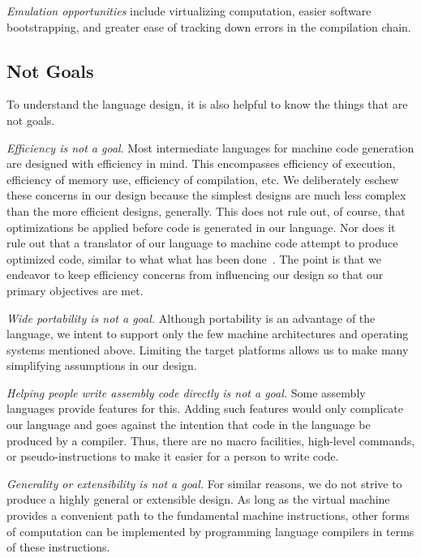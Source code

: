 \emph{Emulation opportunities} include virtualizing computation,
easier software bootstrapping, and greater ease of tracking down errors
in the compilation chain.

\subsection{Not Goals}

To understand the language design, it is also helpful to know the
things that are not goals.

\emph{Efficiency is not a goal}.
Most intermediate languages for machine code generation
are designed with efficiency in mind.
This encompasses efficiency of execution, efficiency
of memory use, efficiency of compilation, etc.
We deliberately eschew these concerns
in our design because the simplest designs
are much less complex than the more efficient designs, generally.
This does not rule out, of course, that optimizations be applied before
code is generated in our language. Nor does it rule out that a translator of
our language to machine code attempt to produce optimized
code, similar to what what has been done~\cite{davidson1980design, tanenbaum1982using}.
The point is that we endeavor to keep efficiency concerns from influencing our
design so that our primary objectives are met.

\emph{Wide portability is not a goal.}
Although portability is an advantage of the language, we intent
to support only the few machine architectures and operating systems
mentioned above. Limiting the target platforms allows us to make
many simplifying assumptions in our design.

\emph{Helping people write assembly code directly is not a goal.}
Some assembly languages provide features for this.
Adding such features would only complicate our language
and goes against the intention that code in the language be
produced by a compiler. Thus, there are no macro facilities, high-level commands,
or pseudo-instructions to make it easier for a person to write code.

\emph{Generality or extensibility is not a goal.}
For similar reasons, we do not strive to produce a highly general
or extensible design. As long as the virtual machine provides
a convenient path to the fundamental machine instructions, other forms of
computation can be implemented by programming language compilers in
terms of these instructions.
